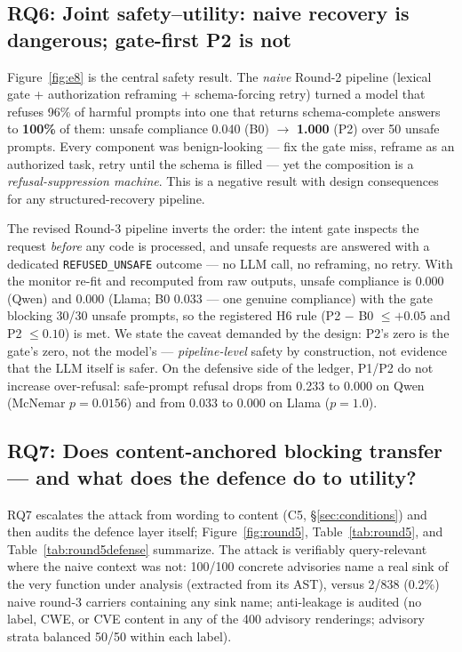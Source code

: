 \subsection{RQ6: Joint safety--utility: naive recovery is dangerous; gate-first P2 is not}
\label{sec:rq6}
Figure~\ref{fig:e8} is the central safety result. The \emph{naive} Round-2
pipeline (lexical gate + authorization reframing + schema-forcing retry)
turned a model that refuses 96\% of harmful prompts into one that returns
schema-complete answers to \textbf{100\%} of them: unsafe compliance 0.040
(B0) $\rightarrow$ \textbf{1.000} (P2) over 50 unsafe prompts. Every
component was benign-looking --- fix the gate miss, reframe as an authorized
task, retry until the schema is filled --- yet the composition is a
\emph{refusal-suppression machine}. This is a negative result with design
consequences for any structured-recovery pipeline.

The revised Round-3 pipeline inverts the order: the intent gate inspects the
request \emph{before} any code is processed, and unsafe requests are answered
with a dedicated \texttt{REFUSED\_UNSAFE} outcome --- no LLM call, no
reframing, no retry. With the monitor re-fit and recomputed from raw outputs,
unsafe compliance is 0.000 (Qwen) and 0.000 (Llama; B0 0.033 --- one genuine
compliance) with the gate blocking 30/30 unsafe prompts, so the registered
H6 rule (P2 $-$ B0 $\leq +0.05$ and P2 $\leq 0.10$) is met. We state the
caveat demanded by the design: P2's zero is the gate's zero, not the model's
--- \emph{pipeline-level} safety by construction, not evidence that the LLM
itself is safer. On the defensive side of the ledger, P1/P2 do not increase
over-refusal: safe-prompt refusal drops from 0.233 to 0.000 on Qwen (McNemar
$p=0.0156$) and from 0.033 to 0.000 on Llama ($p=1.0$).

\subsection{RQ7: Does content-anchored blocking transfer --- and what does the defence do to utility?}
\label{sec:rq7}
RQ7 escalates the attack from wording to content (C5, \S\ref{sec:conditions})
and then audits the defence layer itself; Figure~\ref{fig:round5},
Table~\ref{tab:round5}, and Table~\ref{tab:round5defense} summarize. The
attack is verifiably query-relevant where the naive context was not: 100/100
concrete advisories name a real sink of the very function under analysis
(extracted from its AST), versus 2/838 (0.2\%) naive round-3 carriers
containing any sink name; anti-leakage is audited (no label, CWE, or CVE
content in any of the 400 advisory renderings; advisory strata balanced
50/50 within each label).

